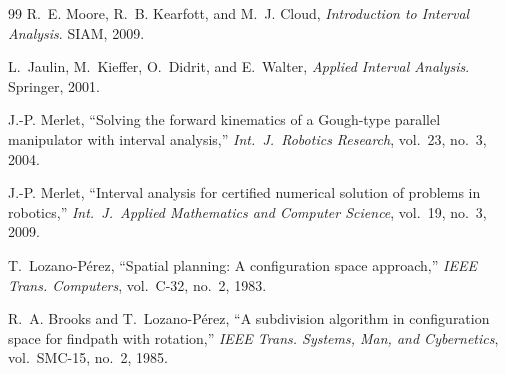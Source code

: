 \documentclass[journal]{IEEEtran}
\begin{document}
\begin{thebibliography}{99}
R.~E. Moore, R.~B. Kearfott, and M.~J. Cloud, \emph{Introduction to
Interval Analysis}. SIAM, 2009.

L.~Jaulin, M.~Kieffer, O.~Didrit, and E.~Walter, \emph{Applied
Interval Analysis}. Springer, 2001.

J.-P. Merlet, ``Solving the forward kinematics of a Gough-type
parallel manipulator with interval analysis,'' \emph{Int.\ J.\ Robotics
Research}, vol.~23, no.~3, 2004.

J.-P. Merlet, ``Interval analysis for certified numerical solution of
problems in robotics,'' \emph{Int.\ J.\ Applied Mathematics and
Computer Science}, vol.~19, no.~3, 2009.

T.~Lozano-P\'erez, ``Spatial planning: A configuration space
approach,'' \emph{IEEE Trans. Computers}, vol.~C-32, no.~2, 1983.

R.~A. Brooks and T.~Lozano-P\'erez, ``A subdivision algorithm in
configuration space for findpath with rotation,'' \emph{IEEE Trans.
Systems, Man, and Cybernetics}, vol.~SMC-15, no.~2, 1985.

\end{thebibliography}
\end{document}

